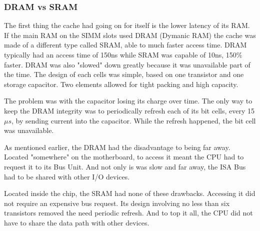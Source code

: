 \subsubsection{DRAM vs SRAM}
The first thing the cache had going on for itself is the lower latency of its RAM. If the main RAM on the SIMM slots used DRAM (Dymanic RAM) the cache was made of a different type called SRAM, able to much faster access time. DRAM typically had an access time of 150ns while SRAM was capable of 10ns, 150\% faster. DRAM was also "slowed" down greatly because it was unavailable part of the time. The design of each cells was simple, based on one transistor and one storage capacitor. Two elements allowed for tight packing and high capacity.\\
\par The problem was with the capacitor losing its charge over time. The only way to keep the DRAM integrity was to periodically refresh each of its bit cells, every 15$\mu s$, by sending current into the capacitor. While the refresh happened, the bit cell was unavailable.\\
\par
{}
As mentioned earlier, the DRAM had the disadvantage to being far away. Located "somewhere" on the motherboard, to access it meant the CPU had to request it to its Bus Unit. And not only is was slow and far away, the ISA Bus had to be shared with other I/O devices.\\
\par
\vspace{2mm}
\par
Located inside the chip, the SRAM had none of these drawbacks. Accessing it did not require an expensive bus request. Its design involving no less than six transistors removed the need periodic refresh. And to top it all, the CPU did not have to share the data path with other devices.
\par










